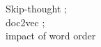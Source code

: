 Skip-thought \autocite{kiros_skip-thought_2015}; \\
doc2vec \autocite{le_distributed_2014,lau_empirical_2016}; \\ 

impact of word order \autocite{pham_sentence_2013}

